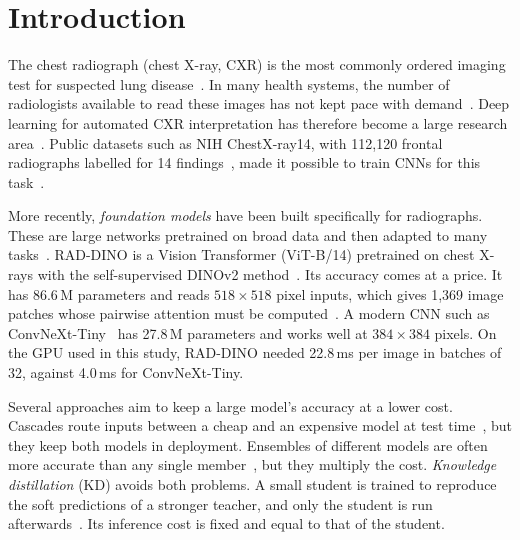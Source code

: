\documentclass[conference]{IEEEtran}
\begin{document}
\section{Introduction}
\label{sec:intro}

The chest radiograph (chest X-ray, CXR) is the most commonly ordered imaging test for suspected lung disease~\cite{raoof2012interpretation}. In many health systems, the number of radiologists available to read these images has not kept pace with demand~\cite{rcr2025census}. Deep learning for automated CXR interpretation has therefore become a large research area~\cite{calli2021deep}. Public datasets such as NIH ChestX-ray14, with 112,120 frontal radiographs labelled for 14 findings~\cite{wang2017chestxray8}, made it possible to train CNNs for this task~\cite{rajpurkar2017chexnet}.

More recently, \emph{foundation models} have been built specifically for radiographs. These are large networks pretrained on broad data and then adapted to many tasks~\cite{moor2023foundation}. RAD-DINO is a Vision Transformer (ViT-B/14) pretrained on chest X-rays with the self-supervised DINOv2 method~\cite{perezgarcia2025raddino,oquab2024dinov2}. Its accuracy comes at a price. It has 86.6\,M parameters and reads $518\times518$ pixel inputs, which gives 1,369 image patches whose pairwise attention must be computed~\cite{dosovitskiy2021vit}. A modern CNN such as ConvNeXt-Tiny~\cite{liu2022convnext} has 27.8\,M parameters and works well at $384\times384$ pixels. On the GPU used in this study, RAD-DINO needed 22.8\,ms per image in batches of 32, against 4.0\,ms for ConvNeXt-Tiny.

Several approaches aim to keep a large model's accuracy at a lower cost. Cascades route inputs between a cheap and an expensive model at test time~\cite{wang2018idk,wang2022wisdom}, but they keep both models in deployment. Ensembles of different models are often more accurate than any single member~\cite{dietterich2000ensemble,lakshminarayanan2017deep}, but they multiply the cost. \emph{Knowledge distillation} (KD) avoids both problems. A small student is trained to reproduce the soft predictions of a stronger teacher, and only the student is run afterwards~\cite{bucilua2006model,hinton2015distilling,gou2021knowledge}. Its inference cost is fixed and equal to that of the student.
\end{document}

